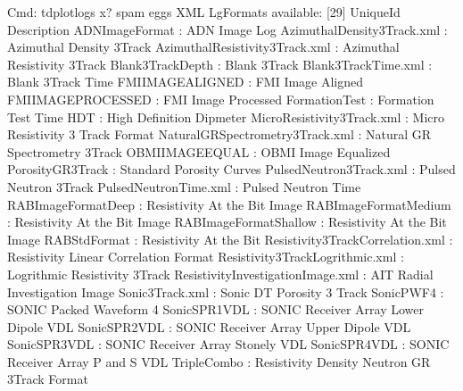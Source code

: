 \documentclass[letterpaper,10pt,english]{sphinxmanual}
\begin{document}
\begin{sphinxVerbatim}[commandchars=\\\{\}]
Cmd: tdplotlogs \PYGZhy{}x? spam eggs
XML LgFormats available: [29]
UniqueId                              Description
\PYGZhy{}\PYGZhy{}\PYGZhy{}\PYGZhy{}\PYGZhy{}\PYGZhy{}\PYGZhy{}\PYGZhy{}\PYGZhy{}\PYGZhy{}\PYGZhy{}\PYGZhy{}\PYGZhy{}\PYGZhy{}\PYGZhy{}\PYGZhy{}\PYGZhy{}\PYGZhy{}\PYGZhy{}\PYGZhy{}\PYGZhy{}\PYGZhy{}\PYGZhy{}\PYGZhy{}\PYGZhy{}\PYGZhy{}\PYGZhy{}\PYGZhy{}\PYGZhy{}\PYGZhy{}\PYGZhy{}\PYGZhy{}\PYGZhy{}\PYGZhy{}\PYGZhy{}   \PYGZhy{}\PYGZhy{}\PYGZhy{}\PYGZhy{}\PYGZhy{}\PYGZhy{}\PYGZhy{}\PYGZhy{}\PYGZhy{}\PYGZhy{}\PYGZhy{}\PYGZhy{}\PYGZhy{}\PYGZhy{}\PYGZhy{}\PYGZhy{}\PYGZhy{}\PYGZhy{}\PYGZhy{}\PYGZhy{}\PYGZhy{}\PYGZhy{}\PYGZhy{}\PYGZhy{}\PYGZhy{}\PYGZhy{}\PYGZhy{}\PYGZhy{}\PYGZhy{}\PYGZhy{}\PYGZhy{}\PYGZhy{}
ADN\PYGZus{}Image\PYGZus{}Format                    : ADN Image Log
Azimuthal\PYGZus{}Density\PYGZus{}3Track.xml        : Azimuthal Density 3Track
Azimuthal\PYGZus{}Resistivity\PYGZus{}3Track.xml    : Azimuthal Resistivity 3Track
Blank\PYGZus{}3Track\PYGZus{}Depth                  : Blank 3Track
Blank\PYGZus{}3Track\PYGZus{}Time.xml               : Blank 3Track Time
FMI\PYGZus{}IMAGE\PYGZus{}ALIGNED                   : FMI Image Aligned
FMI\PYGZus{}IMAGE\PYGZus{}PROCESSED                 : FMI Image Processed
Formation\PYGZus{}Test                      : Formation Test Time
HDT                                 : High Definition Dipmeter
Micro\PYGZus{}Resistivity\PYGZus{}3Track.xml        : Micro Resistivity 3 Track Format
Natural\PYGZus{}GR\PYGZus{}Spectrometry\PYGZus{}3Track.xml  : Natural GR Spectrometry 3Track
OBMI\PYGZus{}IMAGE\PYGZus{}EQUAL                    : OBMI Image Equalized
Porosity\PYGZus{}GR\PYGZus{}3Track                  : Standard Porosity Curves
Pulsed\PYGZus{}Neutron\PYGZus{}3Track.xml           : Pulsed Neutron 3Track
Pulsed\PYGZus{}Neutron\PYGZus{}Time.xml             : Pulsed Neutron Time
RAB\PYGZus{}Image\PYGZus{}Format\PYGZus{}Deep               : Resistivity At the Bit Image
RAB\PYGZus{}Image\PYGZus{}Format\PYGZus{}Medium             : Resistivity At the Bit Image
RAB\PYGZus{}Image\PYGZus{}Format\PYGZus{}Shallow            : Resistivity At the Bit Image
RAB\PYGZus{}Std\PYGZus{}Format                      : Resistivity At the Bit
Resistivity\PYGZus{}3Track\PYGZus{}Correlation.xml  : Resistivity Linear Correlation Format
Resistivity\PYGZus{}3Track\PYGZus{}Logrithmic.xml   : Logrithmic Resistivity 3Track
Resistivity\PYGZus{}Investigation\PYGZus{}Image.xml : AIT Radial Investigation Image
Sonic\PYGZus{}3Track.xml                    : Sonic DT Porosity 3 Track
Sonic\PYGZus{}PWF4                          : SONIC Packed Waveform 4
Sonic\PYGZus{}SPR1\PYGZus{}VDL                      : SONIC Receiver Array Lower Dipole VDL
Sonic\PYGZus{}SPR2\PYGZus{}VDL                      : SONIC Receiver Array Upper Dipole VDL
Sonic\PYGZus{}SPR3\PYGZus{}VDL                      : SONIC Receiver Array Stonely VDL
Sonic\PYGZus{}SPR4\PYGZus{}VDL                      : SONIC Receiver Array P and S VDL
Triple\PYGZus{}Combo                        : Resistivity Density Neutron GR 3Track Format
\end{sphinxVerbatim}
\end{document}
